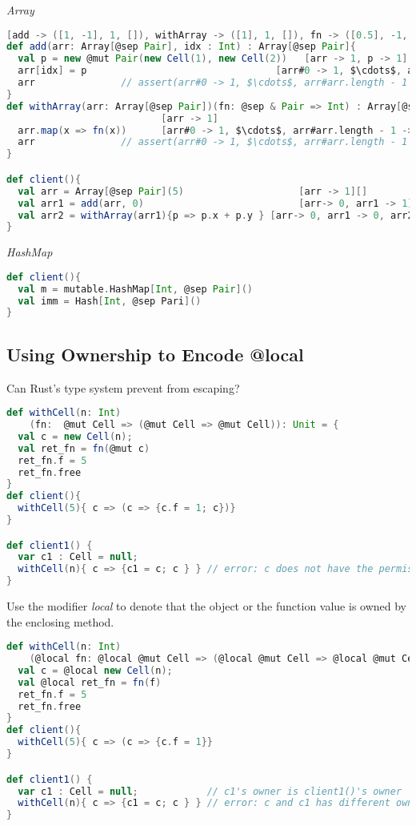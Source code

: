 \emph{Array}
\begin{lstlisting}[language=Scala,basicstyle=\footnotesize\ttfamily]
[add -> ([1, -1], 1, []), withArray -> ([1], 1, []), fn -> ([0.5], -1, [])]
def add(arr: Array[@sep Pair], idx : Int) : Array[@sep Pair]{
  val p = new @mut Pair(new Cell(1), new Cell(2))   [arr -> 1, p -> 1]
  arr[idx] = p                                 [arr#0 -> 1, $\cdots$, arr#arr.length - 1 -> 1] 
  arr               // assert(arr#0 -> 1, $\cdots$, arr#arr.length - 1 -> 1)
}
def withArray(arr: Array[@sep Pair])(fn: @sep & Pair => Int) : Array[@sep Pair]{
                           [arr -> 1]
  arr.map(x => fn(x))      [arr#0 -> 1, $\cdots$, arr#arr.length - 1 -> 1]          
  arr               // assert(arr#0 -> 1, $\cdots$, arr#arr.length - 1 -> 1)
}

def client(){
  val arr = Array[@sep Pair](5)                    [arr -> 1][]
  val arr1 = add(arr, 0)                           [arr-> 0, arr1 -> 1][]
  val arr2 = withArray(arr1){p => p.x + p.y } [arr-> 0, arr1 -> 0, arr2 -> 1][]
}
\end{lstlisting}

\emph{HashMap}
\begin{lstlisting}[language=Scala,basicstyle=\footnotesize\ttfamily]
def client(){
  val m = mutable.HashMap[Int, @sep Pair]()
  val imm = Hash[Int, @sep Pari]()
}
\end{lstlisting}

\clearpage

\subsection{Using Ownership to Encode @local}
Can Rust's type system prevent  from escaping?
\begin{lstlisting}[language=Scala,basicstyle=\footnotesize\ttfamily]
def withCell(n: Int)
    (fn:  @mut Cell => (@mut Cell => @mut Cell)): Unit = {
  val c = new Cell(n);
  val ret_fn = fn(@mut c)
  ret_fn.f = 5
  ret_fn.free 
}
def client(){
  withCell(5){ c => (c => {c.f = 1; c})}
}

def client1() {
  var c1 : Cell = null;
  withCell(n){ c => {c1 = c; c } } // error: c does not have the permission
}
\end{lstlisting}
Use the modifier \emph{local} to denote that the object or the function value is owned by the enclosing method.
\begin{lstlisting}[language=Scala,basicstyle=\footnotesize\ttfamily]
def withCell(n: Int)
    (@local fn: @local @mut Cell => (@local @mut Cell => @local @mut Cell): Unit = {
  val c = @local new Cell(n);
  val @local ret_fn = fn(f)
  ret_fn.f = 5
  ret_fn.free 
}
def client(){
  withCell(5){ c => (c => {c.f = 1}}
}

def client1() {              
  var c1 : Cell = null;            // c1's owner is client1()'s owner
  withCell(n){ c => {c1 = c; c } } // error: c and c1 has different owner
}
\end{lstlisting}

